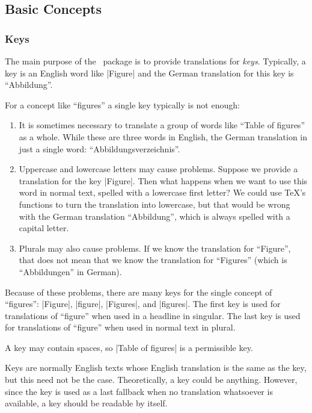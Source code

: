 \subsection{Basic Concepts}

\subsubsection{Keys}

The main purpose of the \translatorname\ package is to provide translations for \emph{keys}. Typically, a key is an English word like |Figure| and the German translation for this key is ``Abbildung''.

For a concept like ``figures'' a single key typically is not enough:
\begin{enumerate}
  \item  It is sometimes necessary to translate a group of words like ``Table of figures'' as a whole. While these are three words in English, the German translation in just a single word: ``Abbildungsverzeichnis''.
  \item Uppercase and lowercase letters may cause problems. Suppose we provide a translation for the key |Figure|. Then what happens when we want to use this word in normal text, spelled with a lowercase first letter? We could use \TeX's functions to turn the translation into lowercase, but that would be wrong with the German translation ``Abbildung'', which is always spelled with a capital letter.
  \item  Plurals may also cause problems. If we know the translation for ``Figure'', that does not mean that we know the translation for ``Figures'' (which is ``Abbildungen'' in German).
\end{enumerate}

Because of these problems, there are many keys for the single concept of ``figures'': |Figure|, |figure|, |Figures|, and |figures|. The first key is used for translations of  ``figure'' when used in a headline in singular. The last key is used for translations of ``figure'' when used in normal text in plural.

A key may contain spaces, so |Table of figures| is a permissible key.

Keys are normally English texts whose English translation is the same as the key, but this need not be the case. Theoretically, a key could be anything. However, since the key is used as a last fallback when no translation whatsoever is available, a key should be readable by itself.

